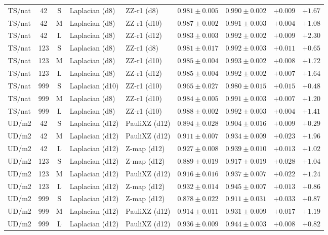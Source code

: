 \documentclass[journal]{IEEEtran}
\begin{document}
\begin{table}[!t]
\begin{tabular}{@{}ccc ll cc rr@{}}
TS/nat & 42 & S & Laplacian (d8) & ZZ-r1 (d8) & $0.981\pm0.005$ & $0.990\pm0.002$ & $+0.009$ & $+1.67$ \\
TS/nat & 42 & M & Laplacian (d8) & ZZ-r1 (d10) & $0.987\pm0.002$ & $0.991\pm0.003$ & $+0.004$ & $+1.08$ \\
TS/nat & 42 & L & Laplacian (d8) & ZZ-r1 (d12) & $0.983\pm0.003$ & $0.992\pm0.002$ & $+0.009$ & $+2.30$ \\
TS/nat & 123 & S & Laplacian (d8) & ZZ-r1 (d8) & $0.981\pm0.017$ & $0.992\pm0.003$ & $+0.011$ & $+0.65$ \\
TS/nat & 123 & M & Laplacian (d8) & ZZ-r1 (d10) & $0.985\pm0.004$ & $0.993\pm0.002$ & $+0.008$ & $+1.72$ \\
TS/nat & 123 & L & Laplacian (d8) & ZZ-r1 (d12) & $0.985\pm0.004$ & $0.992\pm0.002$ & $+0.007$ & $+1.64$ \\
TS/nat & 999 & S & Laplacian (d10) & ZZ-r1 (d10) & $0.965\pm0.027$ & $0.980\pm0.015$ & $+0.015$ & $+0.48$ \\
TS/nat & 999 & M & Laplacian (d8) & ZZ-r1 (d10) & $0.984\pm0.005$ & $0.991\pm0.003$ & $+0.007$ & $+1.20$ \\
TS/nat & 999 & L & Laplacian (d8) & ZZ-r1 (d10) & $0.988\pm0.002$ & $0.992\pm0.003$ & $+0.004$ & $+1.41$ \\
UD/m2 & 42 & S & Laplacian (d12) & PauliXZ (d12) & $0.894\pm0.028$ & $0.904\pm0.016$ & $+0.009$ & $+0.29$ \\
UD/m2 & 42 & M & Laplacian (d12) & PauliXZ (d12) & $0.911\pm0.007$ & $0.934\pm0.009$ & $+0.023$ & $+1.96$ \\
UD/m2 & 42 & L & Laplacian (d12) & Z-map (d12) & $0.927\pm0.008$ & $0.939\pm0.010$ & $+0.013$ & $+1.02$ \\
UD/m2 & 123 & S & Laplacian (d12) & Z-map (d12) & $0.889\pm0.019$ & $0.917\pm0.019$ & $+0.028$ & $+1.04$ \\
UD/m2 & 123 & M & Laplacian (d12) & PauliXZ (d12) & $0.916\pm0.016$ & $0.937\pm0.007$ & $+0.022$ & $+1.24$ \\
UD/m2 & 123 & L & Laplacian (d12) & Z-map (d12) & $0.932\pm0.014$ & $0.945\pm0.007$ & $+0.013$ & $+0.86$ \\
UD/m2 & 999 & S & Laplacian (d12) & Z-map (d12) & $0.878\pm0.022$ & $0.911\pm0.031$ & $+0.033$ & $+0.87$ \\
UD/m2 & 999 & M & Laplacian (d12) & PauliXZ (d12) & $0.914\pm0.011$ & $0.931\pm0.009$ & $+0.017$ & $+1.19$ \\
UD/m2 & 999 & L & Laplacian (d12) & PauliXZ (d12) & $0.936\pm0.009$ & $0.944\pm0.003$ & $+0.008$ & $+0.82$ \\

\end{tabular}
\end{table}
\end{document}
